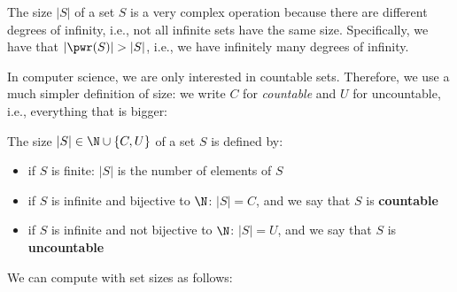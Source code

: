 The size $|S|$ of a set $S$ is a very complex operation because there are different degrees of infinity, i.e., not all infinite sets have the same size.
Specifically, we have that $|\pwr(S)|>|S|$, i.e., we have infinitely many degrees of infinity.

In computer science, we are only interested in countable sets.
Therefore, we use a much simpler definition of size: we write $C$ for \emph{countable} and $U$ for uncountable, i.e., everything that is bigger:

\begin{definition}\label{def:setsize}
The size $|S|\in\N\cup\{C,U\}$ of a set $S$ is defined by:
\begin{itemize}
\item if $S$ is finite: $|S|$ is the number of elements of $S$
\item if $S$ is infinite and bijective to $\N$: $|S|=C$, and we say that $S$ is \textbf{countable}
\item if $S$ is infinite and not bijective to $\N$: $|S|=U$, and we say that $S$ is \textbf{uncountable}
\end{itemize}
\end{definition}

We can compute with set sizes as follows:

